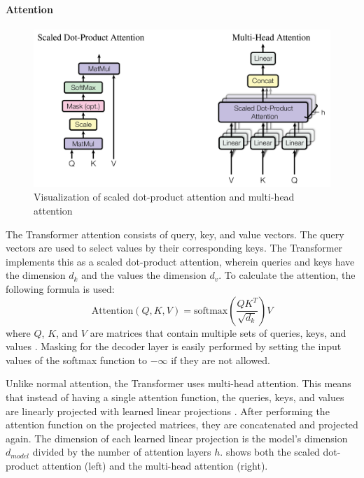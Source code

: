 \paragraph{Attention}

\begin{figure}[h]
\centering
\includegraphics[width=0.7\paperwidth]{figures/scaled-dot-product-multihead-attention}
\caption[Visualization of scaled dot-product attention and multi-mead attention]{Visualization of scaled dot-product attention and multi-head attention \cite[p.~4]{1706.03762}}
\label{fig:scaled-dot-product-multihead-attention}
\end{figure}

The Transformer attention consists of query, key, and value vectors.
The query vectors are used to select values by their corresponding keys.
The Transformer implements this as a scaled dot-product attention, wherein queries and keys have the dimension $d_k$ and the values the dimension $d_v$.
To calculate the attention, the following formula is used:
\[
	\textrm{Attention}(Q,K,V) = \textrm{softmax}(\dfrac{QK^T}{\sqrt{d_k}})V
\]
where $Q$, $K$, and $V$ are matrices that contain multiple sets of queries, keys, and values \cite[p.~3--4]{1706.03762}.
Masking for the decoder layer is easily performed by setting the input values of the softmax function to $-\infty$ if they are not allowed.

Unlike normal attention, the Transformer uses multi-head attention.
This means that instead of having a single attention function, the queries, keys, and values are linearly projected with learned linear projections \cite[p.~4--5]{1706.03762}.
After performing the attention function on the projected matrices, they are concatenated and projected again.
The dimension of each learned linear projection is the model's dimension $d_{model}$ divided by the number of attention layers $h$.
 shows both the scaled dot-product attention (left) and the multi-head attention (right).

